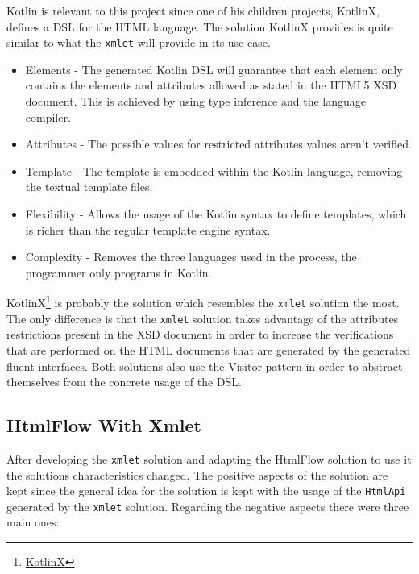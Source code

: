 \noindent
Kotlin is relevant to this project since one of his children projects, KotlinX, defines a \ac{DSL} for the \ac{HTML} language. The solution KotlinX provides is quite similar to what the \texttt{xmlet} will provide in its use case. 

\begin{itemize}
	\item Elements - The generated Kotlin \ac{DSL} will guarantee that each element only contains the elements and attributes allowed as stated in the \ac{HTML}5 \ac{XSD} document. This is achieved by using type inference and the language compiler.
	\item Attributes - The possible values for restricted attributes values aren't verified.
	\item Template - The template is embedded within the Kotlin language, removing the textual template files.
	\item Flexibility - Allows the usage of the Kotlin syntax to define templates, which is richer than the regular template engine syntax.
	\item Complexity - Removes the three languages used in the process, the programmer only programs in Kotlin.
\end{itemize}

\noindent
KotlinX\footnote{\href{https://github.com/Kotlin/kotlinx.coroutines}{KotlinX}} is probably the solution which resembles the \texttt{xmlet} solution the most. The only difference is that the \texttt{xmlet} solution takes advantage of the attributes restrictions present in the \ac{XSD} document in order to increase the verifications that are performed on the \ac{HTML} documents that are generated by the generated fluent interfaces. Both solutions also use the Visitor pattern in order to abstract themselves from the concrete usage of the \ac{DSL}.


\subsection{HtmlFlow With Xmlet}
\label{sec:htmlflowwithxmlet}

After developing the \texttt{xmlet} solution and adapting the HtmlFlow solution to use it the solutions characteristics changed. The positive aspects of the solution are kept since the general idea for the solution is kept with the usage of the \texttt{HtmlApi} generated by the \texttt{xmlet} solution. Regarding the negative aspects there were three main ones:

